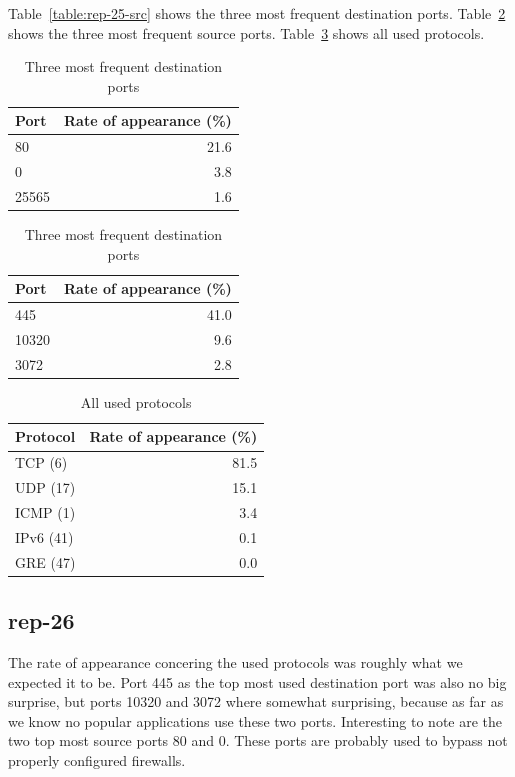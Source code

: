 \documentclass{article}
\begin{document}
Table~\ref{table:rep-25-src} shows the three most frequent destination ports.
Table~\ref{table:rep-25-dst} shows the three most frequent source ports.
Table~\ref{table:rep-25-proto} shows all used protocols.

\begin{table}[H]
    \parbox{.45\linewidth}{
        \centering
        \begin{tabular}{l|r}
            Port & Rate of appearance (\%) \\
            \hline
            80 & 21.6 \\
            0 & 3.8 \\
            25565 & 1.6 \\
        \end{tabular}
        \caption{\label{table:rep-25-src} Three most frequent source ports}
    }
    \parbox{.45\linewidth}{
        \centering
        \begin{tabular}{l|r}
            Port & Rate of appearance (\%) \\
            \hline
            445 & 41.0 \\
            10320 & 9.6 \\
            3072 & 2.8 \\
        \end{tabular}
        \caption{\label{table:rep-25-dst} Three most frequent destination ports}
    }
\end{table}

\begin{table}[h]
    \centering
    \begin{tabular}{l|r}
        Protocol & Rate of appearance (\%) \\
        \hline
        TCP (6) & 81.5 \\
        UDP (17) & 15.1 \\
        ICMP (1) & 3.4 \\
        IPv6 (41) & 0.1 \\
        GRE (47) & 0.0 \\
    \end{tabular}
    \caption{\label{table:rep-25-proto} All used protocols}
\end{table}

\subsection{rep-26}

The rate of appearance concering the used protocols was roughly what we expected it to be. Port
445 as the top most used destination port was also no big surprise, but ports 10320 and 3072 where
somewhat surprising, because as far as we know no popular applications use these two ports.
Interesting to note are the two top most source ports 80 and 0. These ports are probably used to
bypass not properly configured firewalls.
\end{document}
